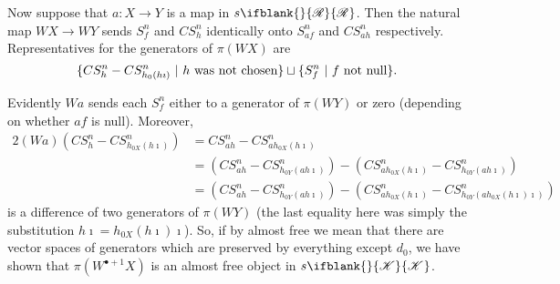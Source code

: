 \documentclass[10pt]{article}
\newcommand{\PRLie}[1]%
{\ifblank{#1}{\scrR}{\scrR^{#1}}}
\newcommand{\LL}[1]{\ifblank{#1}{\scrK}{\scrK^{#1}}}
\begin{document}
\begin{Grothendieck Multiplicativity}
Now suppose that $a:X\to Y$ is a map in $s\PRLie{}$. Then the natural map $WX\to WY$ sends $S^n_f$ and $CS^n_h$ identically onto $S^n_{af}$ and $CS^n_{ah}$ respectively. Representatives for the generators of $\pi(WX)$ are 
\[\{CS^n_h-CS^n_{h_0(h\imath)}\ |\ \textup{$h$ was not chosen}\}\sqcup\{S^n_f\ |\ \textup{$f$ not null}\}.\]


Evidently $Wa$ sends each $S^n_f$ either to a generator of $\pi(WY)$ or zero (depending on whether $af$ is null). Moreover,
\begin{alignat*}{2}
(Wa)(CS^n_h-CS^n_{h_{0X}(h\imath)})
&=
CS^n_{ah}-CS^n_{ah_{0X}(h\imath)}%
\\
&=
\left(CS^n_{ah}-CS^n_{h_{0Y}(ah\imath)}\right)-\left(CS^n_{ah_{0X}(h\imath)}-CS^n_{h_{0Y}(ah\imath)}\right)%
\\
&=
\left(CS^n_{ah}-CS^n_{h_{0Y}(ah\imath)}\right)-\left(CS^n_{ah_{0X}(h\imath)}-CS^n_{h_{0Y}(ah_{0X}(h\imath)\imath)}\right)%
\end{alignat*}
is a difference of two generators of $\pi(WY)$ (the last equality here was simply the substitution $h\imath=h_{0X}(h\imath)\imath$). So, if by almost free we mean that there are vector spaces of generators which are preserved by everything except $d_0$, we have shown that $\pi(W^{\bullet+1}X)$ is an almost free object in $s\LL{}$.

\end{Grothendieck Multiplicativity}
\end{document}
